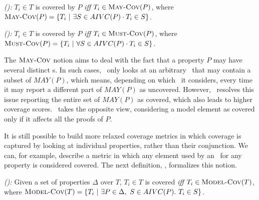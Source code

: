 \begin{definition} {\emph{(\maycov):}}
  \label{def:comp-1}
 $T_i \in T$ is covered by $P$ \emph{iff} $T_i \in \text{\sc May-Cov} (P)$, where
   $\text{\sc May-Cov} (P) = \{T_i ~|~ \exists S \in AIVC(P) \cdot T_i \in S \}$.
\end{definition}

\begin{definition} {\emph{(\mustcov):}}
  \label{def:mustcov}
 $T_i \in T$ is covered by $P$ \emph{iff} $T_i \in \text{\sc Must-Cov} (P)$, where
   $\text{\sc Must-Cov} (P) = \{T_i ~|~ \forall S \in AIVC(P) \cdot T_i \in S \}$.
\end{definition}

The $\text{\sc May-Cov}$ notion aims to deal with the fact that a property $P$ may have
several distinct \mivc s. In such cases, \ivccov\ only looks at an arbitrary \mivc\
that may contain a subset of $MAY(P)$, which means, depending on
which \mivc\ it considers, every time it may report a different part of $MAY(P)$
as uncovered. However, \maycov\ resolves this issue reporting the entire set of $MAY(P)$ as covered, which also leads to higher coverage scores.  \mustcov\ takes the opposite view, considering a model element as covered only if it affects all the proofs of $P$.


It is still possible to build more relaxed coverage metrics in which coverage
is captured by looking at individual properties, rather than their conjunction.
We can, for example, describe a metric in which any element used by an \mivc ~for any property is considered covered.
%
The next definition, \allcov, formalizes this notion.
\begin{definition} {\emph{(\allcov):}}
  \label{def:comp-2}
     Given a set of properties $\Delta$ over $T$, $T_i \in T$ is covered
   \emph{iff} $T_i \in \text{\sc Model-Cov} (T)$, where
   $\text{\sc Model-Cov} (T) = \{T_i ~|~ \exists P \in \Delta ,~ S \in AIVC(P).~T_i \in S \}$.
\end{definition}


